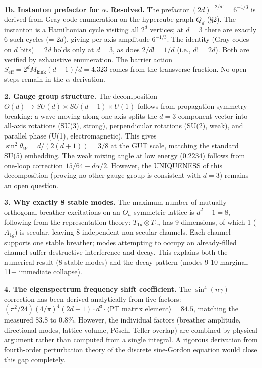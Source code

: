 \documentclass[
]{article}
\begin{document}
\textbf{1b. Instanton prefactor for \(\alpha\).} \textbf{Resolved.} The
prefactor \((2d)^{-2/d!} = 6^{-1/3}\) is derived from Gray code
enumeration on the hypercube graph \(Q_d\) (§2). The instanton is a
Hamiltonian cycle visiting all \(2^d\) vertices; at \(d=3\) there are
exactly 6 such cycles (= \(2d\)), giving per-axis amplitude
\(6^{-1/3}\). The identity (Gray codes on \(d\) bits) = \(2d\) holds
only at \(d=3\), as does \(2/d! = 1/d\) (i.e., \(d! = 2d\)). Both are
verified by exhaustive enumeration. The barrier action
\(S_\text{eff} = 2^d M_\text{kink}(d\!-\!1)/d = 4.323\) comes from the
transverse fraction. No open steps remain in the \(\alpha\) derivation.

\textbf{2. Gauge group structure.} The decomposition
\(O(d) \to SU(d) \times SU(d-1) \times U(1)\) follows from propagation
symmetry breaking: a wave moving along one axis splits the \(d=3\)
component vector into all-axis rotations (SU(3), strong), perpendicular
rotations (SU(2), weak), and parallel phase (U(1), electromagnetic).
This gives \(\sin^2\theta_W = d/(2(d+1)) = 3/8\) at the GUT scale,
matching the standard SU(5) embedding. The weak mixing angle at low
energy (\(0.2234\)) follows from one-loop correction
\(15/64 - d\alpha/2\). However, the UNIQUENESS of this decomposition
(proving no other gauge group is consistent with \(d=3\)) remains an
open question.

\textbf{3. Why exactly 8 stable modes.} The maximum number of mutually
orthogonal breather excitations on an \(O_h\)-symmetric lattice is
\(d^2-1=8\), following from the representation theory:
\(T_{1u} \otimes T_{1u}\) has 9 dimensions, of which 1 (\(A_{1g}\)) is
secular, leaving 8 independent non-secular channels. Each channel
supports one stable breather; modes attempting to occupy an
already-filled channel suffer destructive interference and decay. This
explains both the numerical result (8 stable modes) and the decay
pattern (modes 9-10 marginal, 11+ immediate collapse).

\textbf{4. The eigenspectrum frequency shift coefficient.} The
\(\sin^4(n\gamma)\) correction has been derived analytically from five
factors:
\((\pi^2/24)(4/\pi)^4(2d-1) \cdot d^3 \cdot \langle\text{PT matrix element}\rangle = 84.5\),
matching the measured 83.8 to 0.8\%. However, the individual factors
(breather amplitude, directional modes, lattice volume, Pöschl-Teller
overlap) are combined by physical argument rather than computed from a
single integral. A rigorous derivation from fourth-order perturbation
theory of the discrete sine-Gordon equation would close this gap
completely.
\end{document}
